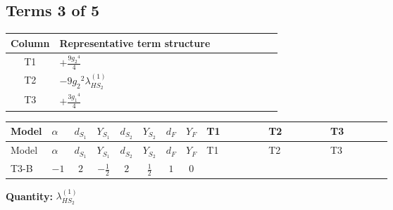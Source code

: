 \documentclass[8pt]{article}
\begin{document}
\begin{landscape}
\subsection*{Terms 3 of 5}
\begin{center}
\begin{tabular}{@{}c >{\raggedright\arraybackslash}p{0.82\linewidth}@{}}
\toprule
Column & Representative term structure \\
\midrule
T1 & \(\displaystyle +\frac{9 {g_2}^4}{4}\) \\
\midrule
T2 & \(\displaystyle -9 {g_2}^2 {\lambda_{HS_2}^{(1)}}\) \\
\midrule
T3 & \(\displaystyle +\frac{3 {g_1}^4}{4}\) \\
\midrule
\bottomrule
\end{tabular}
\end{center}
\smallskip
\tiny
\begin{longtable}{@{}llcccccc >{\raggedright\arraybackslash}p{0.21\linewidth} >{\raggedright\arraybackslash}p{0.21\linewidth} >{\raggedright\arraybackslash}p{0.21\linewidth}@{}}
\toprule
Model & $\alpha$ & $d_{S_1}$ & $Y_{S_1}$ & $d_{S_2}$ & $Y_{S_2}$ & $d_F$ & $Y_F$ & T1 & T2 & T3 \\
\midrule
\endfirsthead
\toprule
Model & $\alpha$ & $d_{S_1}$ & $Y_{S_1}$ & $d_{S_2}$ & $Y_{S_2}$ & $d_F$ & $Y_F$ & T1 & T2 & T3 \\
\midrule
\endhead
T3-B & $-1$ & $2$ & $-\frac{1}{2}$ & $2$ & $\frac{1}{2}$ & $1$ & $0$ & \scriptsize\adjustbox{max width=\linewidth}{$\begin{gathered} +\frac{9 {g_2}^4}{4}\end{gathered}$} & \scriptsize\adjustbox{max width=\linewidth}{$\begin{gathered} -9 {g_2}^2 {\lambda_{HS_2}^{(1)}}\end{gathered}$} & \scriptsize\adjustbox{max width=\linewidth}{$\begin{gathered} +\frac{3 {g_1}^4}{4}\end{gathered}$} \\
\midrule
\bottomrule
\end{longtable}
\clearpage
\noindent\textbf{Quantity: }$\lambda_{HS_2}^{(1)}$\par\smallskip

\end{landscape}
\end{document}
